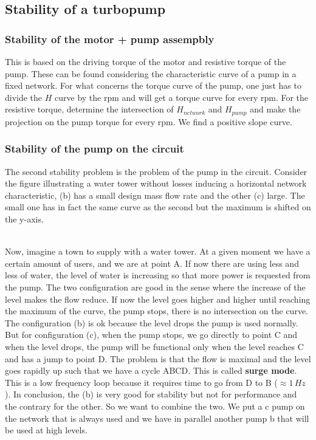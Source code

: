 \subsection{Stability of a turbopump}
\subsubsection{Stability of the motor + pump assempbly}
This is based on the driving torque of the motor and resistive torque of the pump. These can be found considering the characteristic curve of a pump in a fixed network. For what concerns the torque curve of the pump, one just has to divide the $H$ curve by the rpm and will get a torque curve for every rpm. For the resistive torque, determine the intersection of $H_{network}$ and $H_{pump}$ and make the projection on the pump torque for every rpm. We find a positive slope curve. 

\subsubsection{Stability of the pump on the circuit}
The second stability problem is the problem of the pump in the circuit. Consider the figure illustrating a water tower without losses inducing a horizontal network characteristic, (b) has a small design mass flow rate and the other (c) large. The small one has in fact the same curve as the second but the maximum is shifted on the y-axis. 

\ \\
Now, imagine a town to supply with a water tower. At a given moment we have a certain amount of users, and we are at point A. If now there are using less and less of water, the level of water is increasing so that more power is requested from the pump. The two configuration are good in the sense where the increase of the level makes the flow reduce. If now the level goes higher and higher until reaching the maximum of the curve, the pump stops, there is no intersection on the curve. The configuration (b) is ok because the level drops the pump is used normally. 
\ \\

But for configuration (c), when the pump stops, we go directly to point C and when the level drops, the pump will be functional only when the level reaches C and has a jump to point D. The problem is that the flow is maximal and the level goes rapidly up such that we have a cycle ABCD. This is called \textbf{surge mode}. This is a low frequency loop because it requires time to go from D to B ($\approx 1\, Hz$). In conclusion, the (b) is very good for stability but not for performance and the contrary for the other. So we want to combine the two. We put a c pump on the network that is always used and we have in parallel another pump b that will be used at high levels. 

